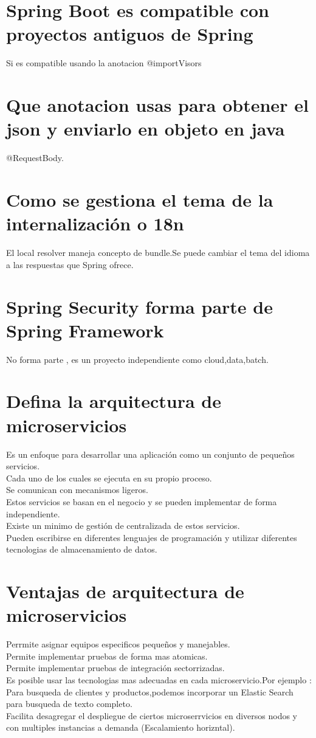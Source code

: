 \section{Spring Boot es compatible con proyectos antiguos de Spring}
Si es compatible usando la anotacion @importVisors
\section{Que anotacion usas para obtener el json y enviarlo en objeto en java}
@RequestBody.
\section{Como se gestiona el tema de la internalizaci\'on o 18n}
El local resolver maneja concepto de bundle.Se puede cambiar el tema del idioma 
a las respuestas que Spring ofrece.
\section{Spring Security forma parte de Spring Framework}
No forma parte , es un proyecto independiente como cloud,data,batch.
\section{Defina la arquitectura de microservicios}
Es un enfoque para desarrollar una aplicaci\'on como un conjunto de peque\~nos servicios.\\
Cada uno de los cuales se ejecuta en su propio proceso.\\
Se comunican con mecanismos ligeros.\\
Estos servicios se basan en el negocio y se pueden implementar de forma independiente.\\
Existe un minimo de gesti\'on de centralizada de estos servicios.\\
Pueden escribirse en diferentes lenguajes de programaci\'on y utilizar diferentes tecnologias de almacenamiento de datos.
\section{Ventajas de arquitectura de microservicios}
Perrmite asignar equipos especificos peque\~nos y manejables.\\
Permite implementar pruebas de forma mas atomicas.\\
Permite implementar pruebas de integraci\'on sectorrizadas.\\
Es posible usar las tecnologias mas adecuadas en cada microservicio.Por ejemplo : Para busqueda de
clientes y productos,podemos incorporar un Elastic Search para busqueda de texto completo.\\
Facilita desagregar el despliegue de ciertos microserrvicios en diversos nodos y con multiples instancias a
demanda (Escalamiento horizntal).
